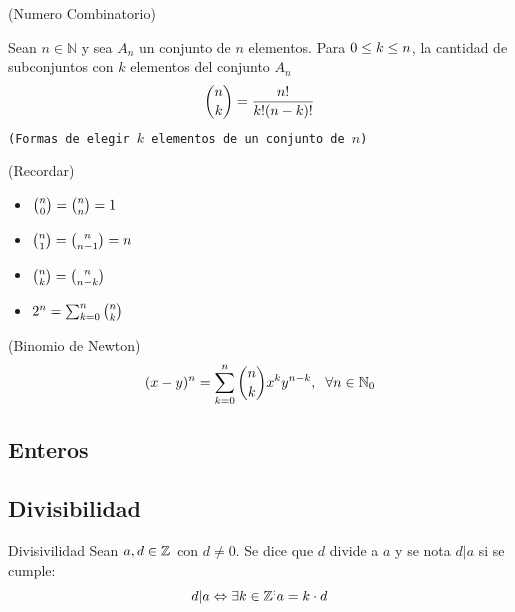 \documentclass[10pt]{article}
\begin{document}
\begin{teo}(Numero Combinatorio)

Sean $n \in \mathbb{N}$ y sea $A_n$ un conjunto de $n$ elementos. Para $0 \leq k \leq n$, la cantidad de subconjuntos con $k$ elementos del conjunto $A_n$ 
\[{n \choose k} = \frac{n!}{k!(n-k)!}\]
\small{\texttt{(Formas de elegir $k$ elementos de un conjunto de $n$)}}
\end{teo}

\begin{obs}(Recordar)

\begin{itemize}
\item ${n \choose 0} = {n \choose n} = 1$
\item ${n \choose 1} = {n \choose n-1} = n$
\item ${n \choose k} = {n \choose n-k} $
\item $2^n = \sum_{k=0}^{n} {n \choose k}$
\end{itemize}
\end{obs}

\begin{teo}(Binomio de Newton)
\[(x-y)^n = \sum_{k=0}^{n} {n \choose k} x^k y^{n-k} , \hspace{0.2cm} \forall n \in \mathbb{N}_0\]
\end{teo}


\begin{center}
\section{Enteros}
\subsection{Divisibilidad} 
\end{center}

\begin{defi}{Divisivilidad}
Sean $a,d \in \mathbb{Z}^{}$ con $d \neq 0 $. Se dice que $d$ divide a $a$ y se nota $d|a$ si se cumple:
\[d|a \Leftrightarrow \exists k \in \mathbb{Z}^{:} a = k \cdot d\]
\end{defi}
\end{document}
